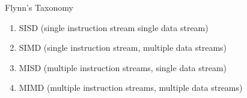 \documentclass[10pt]{beamer}
\begin{document}
\begin{frame}{Flynn's Taxonomy}

\begin{enumerate}
 \item SISD (single instruction stream single data stream)
 \item SIMD (single instruction stream, multiple data streams)
 \item MISD (multiple instruction streams, single data stream)
 \item MIMD (multiple instruction streams, multiple data streams)
\end{enumerate}

\end{frame}
\end{document}
